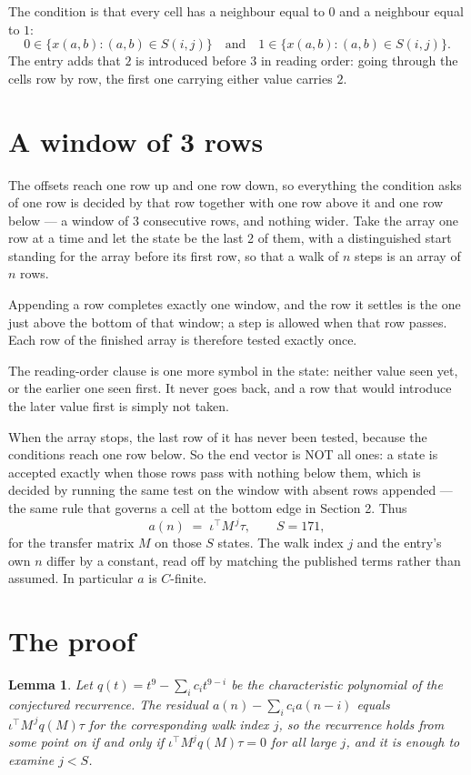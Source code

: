 \documentclass[11pt,a4paper]{article}
\theoremstyle{plain}
\newtheorem{lemma}[theorem]{Lemma}
\theoremstyle{definition}
\begin{document}
The condition is that every cell has a neighbour equal to $0$ and a neighbour equal to $1$:
\[
0\in\{x(a,b):(a,b)\in S(i,j)\}\quad\text{and}\quad1\in\{x(a,b):(a,b)\in S(i,j)\}.
\]
The entry adds that $2$ is introduced before $3$ in reading order: going through the cells row by row, the first one carrying either value carries $2$.

\section{A window of 3 rows}

The offsets reach one row up and one row down, so everything the condition asks of one row is
decided by that row together with one row above it and one row below --- a window of
$3$ consecutive rows, and nothing wider. Take the array one row at a time and
let the state be the last 2 of them, with a distinguished start standing for the array before its
first row, so that a walk of $n$ steps is an array of $n$ rows.

Appending a row completes exactly one window, and the row it settles is the one just above the bottom of that window; a step is
allowed when that row passes. Each row of the finished array is therefore tested exactly once.

The reading-order clause is one more symbol in the state: neither value seen yet, or the earlier
one seen first. It never goes back, and a row that would introduce the later value first is
simply not taken.

When the array stops, the last row of it has never been tested, because the
conditions reach one row below. So the end vector is NOT all ones: a state is accepted exactly when
those rows pass with nothing below them, which is decided by running the same test on the window
with absent rows appended --- the same rule that governs a cell at the bottom edge in
Section 2.
Thus
\[
a(n)\;=\;\iota^{\!\top}M^{\,j}\tau ,\qquad S=171,
\]
for the transfer matrix $M$ on those $S$ states. The walk index $j$ and the entry's own $n$
differ by a constant, read off by matching the published terms rather than assumed. In
particular $a$ is $C$-finite.

\section{The proof}

\begin{lemma}\label{lem:crit}
Let $q(t)=t^{9}-\sum_i c_it^{9-i}$ be the characteristic polynomial of the
conjectured recurrence. The residual $a(n)-\sum_ic_ia(n-i)$ equals
$\iota^{\!\top}M^{\,j}q(M)\tau$ for the corresponding walk index $j$, so the recurrence
holds from some point on if and only if $\iota^{\!\top}M^{j}q(M)\tau=0$ for all large $j$,
and it is enough to examine $j<S$.
\end{lemma}
\end{document}
